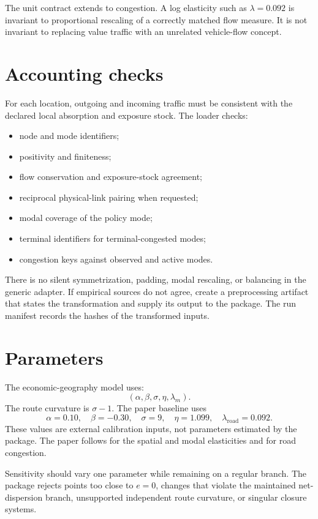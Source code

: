 The unit contract extends to congestion. A log elasticity such as
\(\lambda=0.092\) is invariant to proportional rescaling of a correctly
matched flow measure. It is not invariant to replacing value traffic with an
unrelated vehicle-flow concept.

\section{Accounting checks}

For each location, outgoing and incoming traffic must be consistent with the
declared local absorption and exposure stock. The loader checks:
\begin{itemize}
  \item node and mode identifiers;
  \item positivity and finiteness;
  \item flow conservation and exposure-stock agreement;
  \item reciprocal physical-link pairing when requested;
  \item modal coverage of the policy mode;
  \item terminal identifiers for terminal-congested modes;
  \item congestion keys against observed and active modes.
\end{itemize}

There is no silent symmetrization, padding, modal rescaling, or balancing in the
generic adapter. If empirical sources do not agree, create a preprocessing
artifact that states the transformation and supply its output to the package.
The run manifest records the hashes of the transformed inputs.

\section{Parameters}

The economic-geography model uses:
\[
 (\alpha,\beta,\sigma,\eta,\lambda_m).
\]
The route curvature is \(\sigma-1\). The paper baseline uses
\[
 \alpha=0.10,\quad
 \beta=-0.30,\quad
 \sigma=9,\quad
 \eta=1.099,\quad
 \lambda_{\mathrm{road}}=0.092.
\]
These values are external calibration inputs, not parameters estimated by the
package. The paper follows \citet{FuchsWong2024Multimodal} for the spatial and
modal elasticities and \citet{AA_2022restud} for road congestion.

Sensitivity should vary one parameter while remaining on a regular branch.
The package rejects points too close to \(e=0\), changes that violate the
maintained net-dispersion branch, unsupported independent route curvature, or
singular closure systems.

